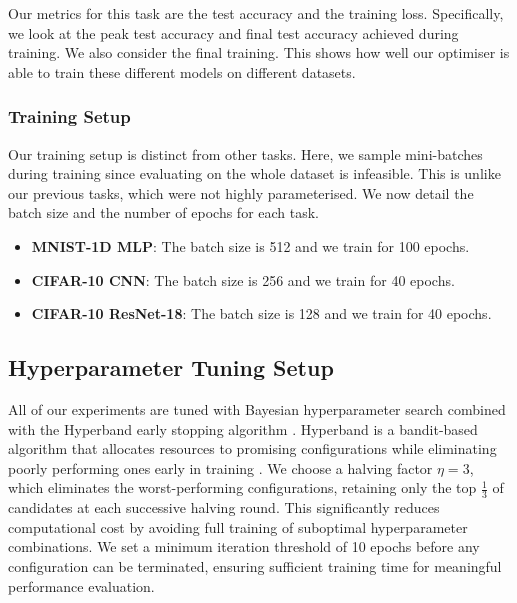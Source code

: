 Our metrics for this task are the test accuracy and the training loss. Specifically, we look at the peak test accuracy and final test accuracy achieved during training. We also consider the final training. This shows how well our optimiser is able to train these different models on different datasets.

\subsubsection{Training Setup}
\label{sssec:task_3_training_setup}

Our training setup is distinct from other tasks. Here, we sample mini-batches during training since evaluating on the whole dataset is infeasible. This is unlike our previous tasks, which were not highly parameterised. We now detail the batch size and the number of epochs for each task.
\begin{itemize}
    \item \textbf{MNIST-1D MLP}: The batch size is 512 and we train for 100 epochs.
    \item \textbf{CIFAR-10 CNN}: The batch size is 256 and we train for 40 epochs.
    \item \textbf{CIFAR-10 ResNet-18}: The batch size is 128 and we train for 40 epochs.
\end{itemize}

\subsection{Hyperparameter Tuning Setup}
\label{ssec:hyperparameter_tuning_setup}

All of our experiments are tuned with Bayesian hyperparameter search combined with the Hyperband early stopping algorithm \citep{li2018hyperband}. Hyperband is a bandit-based algorithm that allocates resources to promising configurations while eliminating poorly performing ones early in training \citep{li2018hyperband}. We choose a halving factor $\eta = 3$, which eliminates the worst-performing configurations, retaining only the top $\frac{1}{3}$ of candidates at each successive halving round. This significantly reduces computational cost by avoiding full training of suboptimal hyperparameter combinations. We set a minimum iteration threshold of 10 epochs before any configuration can be terminated, ensuring sufficient training time for meaningful performance evaluation.

